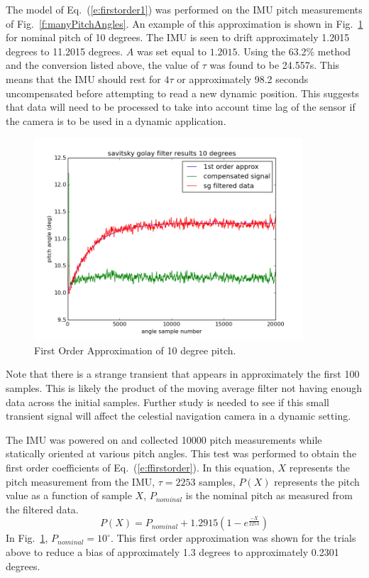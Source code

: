\documentclass[12pt,a4paper]{book}
\begin{document}
The model of Eq.~(\ref{e:firstorder1}) was performed on the IMU pitch measurements of Fig.~\ref{f:manyPitchAngles}.  An example of this approximation is shown in Fig.~\ref{f:firstorder} for nominal pitch of 10 degrees.  The IMU is seen to drift approximately 1.2015 degrees to 11.2015 degrees. $A$ was set equal to $1.2015$.   Using the 63.2\% method and the conversion listed above, the value of $\tau$ was found to be 24.557s.  This means that the IMU should rest for $4\tau$ or approximately 98.2 seconds uncompensated before attempting to read a new dynamic position.  This suggests that data will need to be processed to take into account time lag of the sensor if the camera is to be used in a dynamic application.

\begin{figure}[!ht]%
\centering
 \includegraphics[width=10cm]{firstorder0.png}
 \caption{First Order Approximation of 10 degree pitch.}
 \label{f:firstorder}
\end{figure} 
Note that there is a strange transient that appears in approximately the first 100 samples.  This is likely the product of the moving average filter not having enough data across the initial samples. Further study is needed to see if this small transient signal will affect the celestial navigation camera in a dynamic setting. 

The IMU was powered on and collected 10000 pitch measurements while statically oriented at various pitch angles.  This test was performed to obtain the first order coefficients of  Eq.~(\ref{e:ffirstorder}). In this equation, $X$ represents the pitch measurement from the IMU, $\tau = 2253$ samples, $P(X)$ represents the pitch value as a function of sample $X$,  $P_{nominal}$ is the nominal pitch as measured from the filtered data.
\begin{equation}
P(X) = P_{nominal}+1.2915(1-e^{\frac{-X}{2253}})
\label{e:ffirstorder}
\end{equation}
In Fig.~\ref{f:firstorder}, $P_{nominal} = 10^{\circ}$.  This first order approximation was shown for the trials above to reduce a bias of approximately 1.3 degrees to approximately 0.2301 degrees. 
\end{document}
